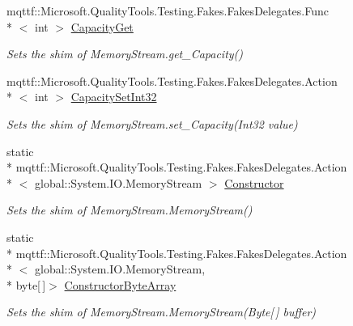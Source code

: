 \begin{DoxyCompactItemize}
mqttf\-::\-Microsoft.\-Quality\-Tools.\-Testing.\-Fakes.\-Fakes\-Delegates.\-Func\\*
$<$ int $>$ \hyperlink{class_system_1_1_i_o_1_1_fakes_1_1_shim_memory_stream_ad947051288717cc6b36d7ff416736762}{Capacity\-Get}
\begin{DoxyCompactList}\small\item\em Sets the shim of Memory\-Stream.\-get\-\_\-\-Capacity()\end{DoxyCompactList}\item 
mqttf\-::\-Microsoft.\-Quality\-Tools.\-Testing.\-Fakes.\-Fakes\-Delegates.\-Action\\*
$<$ int $>$ \hyperlink{class_system_1_1_i_o_1_1_fakes_1_1_shim_memory_stream_a4b28019d3a21eb2e5d5d1056d5659d48}{Capacity\-Set\-Int32}
\begin{DoxyCompactList}\small\item\em Sets the shim of Memory\-Stream.\-set\-\_\-\-Capacity(\-Int32 value)\end{DoxyCompactList}\item 
static \\*
mqttf\-::\-Microsoft.\-Quality\-Tools.\-Testing.\-Fakes.\-Fakes\-Delegates.\-Action\\*
$<$ global\-::\-System.\-I\-O.\-Memory\-Stream $>$ \hyperlink{class_system_1_1_i_o_1_1_fakes_1_1_shim_memory_stream_aec9b36487e6846875d3b458872b95ded}{Constructor}
\begin{DoxyCompactList}\small\item\em Sets the shim of Memory\-Stream.\-Memory\-Stream()\end{DoxyCompactList}\item 
static \\*
mqttf\-::\-Microsoft.\-Quality\-Tools.\-Testing.\-Fakes.\-Fakes\-Delegates.\-Action\\*
$<$ global\-::\-System.\-I\-O.\-Memory\-Stream, \\*
byte\mbox{[}$\,$\mbox{]}$>$ \hyperlink{class_system_1_1_i_o_1_1_fakes_1_1_shim_memory_stream_ab37a949a65195a6ef387835657ffaeff}{Constructor\-Byte\-Array}
\begin{DoxyCompactList}\small\item\em Sets the shim of Memory\-Stream.\-Memory\-Stream(\-Byte\mbox{[}$\,$\mbox{]} buffer)\end{DoxyCompactList}\item 

\end{DoxyCompactItemize}

